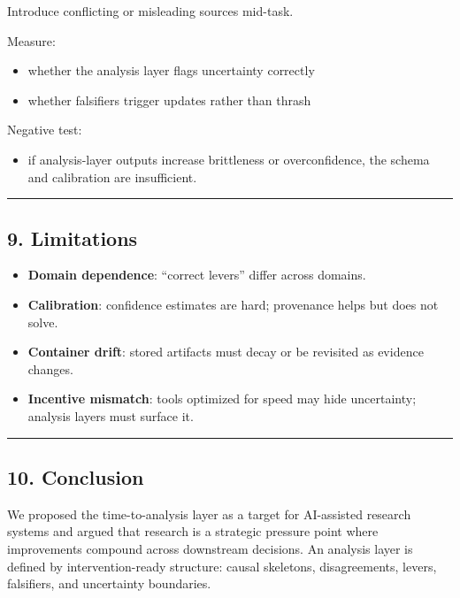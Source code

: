 \documentclass[11pt]{article}
\providecommand{\tightlist}{%
  \setlength{\itemsep}{0pt}\setlength{\parskip}{0pt}}
\begin{document}
Introduce conflicting or misleading sources mid-task.

Measure:

\begin{itemize}
\tightlist
\item
  whether the analysis layer flags uncertainty correctly
\item
  whether falsifiers trigger updates rather than thrash
\end{itemize}

Negative test:

\begin{itemize}
\tightlist
\item
  if analysis-layer outputs increase brittleness or overconfidence, the
  schema and calibration are insufficient.
\end{itemize}

\begin{center}\rule{0.5\linewidth}{0.5pt}\end{center}

\hypertarget{limitations}{%
\subsection{9. Limitations}\label{limitations}}

\begin{itemize}
\tightlist
\item
  \textbf{Domain dependence}: ``correct levers'' differ across domains.
\item
  \textbf{Calibration}: confidence estimates are hard; provenance helps
  but does not solve.
\item
  \textbf{Container drift}: stored artifacts must decay or be revisited
  as evidence changes.
\item
  \textbf{Incentive mismatch}: tools optimized for speed may hide
  uncertainty; analysis layers must surface it.
\end{itemize}

\begin{center}\rule{0.5\linewidth}{0.5pt}\end{center}

\hypertarget{conclusion}{%
\subsection{10. Conclusion}\label{conclusion}}

We proposed the time-to-analysis layer as a target for AI-assisted
research systems and argued that research is a strategic pressure point
where improvements compound across downstream decisions. An analysis
layer is defined by intervention-ready structure: causal skeletons,
disagreements, levers, falsifiers, and uncertainty boundaries.
\end{document}
